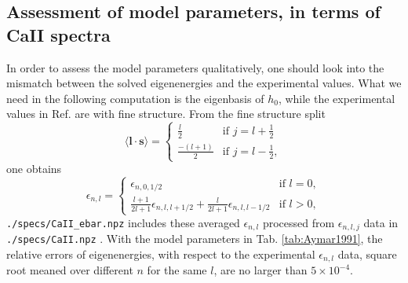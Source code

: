 \documentclass{article}
\begin{document}
\subsection{Assessment of model parameters, in terms of CaII spectra}
In order to assess the model parameters qualitatively, one should look into the mismatch between the solved eigenenergies and the experimental values. What we need in the following computation is the eigenbasis of $h_0$, while the experimental values in Ref. \cite{SC85} are with fine structure. From the fine structure split
\begin{equation}
\langle\bm{l}\cdot\bm{s}\rangle = \left\{
\begin{array}{ll}
\frac l2 &\text{if }j=l+\frac 12\\
\frac{-(l+1)}{2} &\text{if }j=l-\frac{1}{2},
\end{array}\right.
\end{equation}
one obtains
\begin{equation}
\epsilon_{n,l} = \left\{
\begin{array}{ll}
\epsilon_{n,0,1/2} & \text{if }l=0,\\
\frac{l+1}{2l+1}\epsilon_{n,l,l+1/2} + \frac{l}{2l+1}\epsilon_{n,l,l-1/2} & \text{if }l>0 ,
\end{array}\right.
\end{equation}
\texttt{./specs/CaII_ebar.npz} includes these averaged $\epsilon_{n,l}$ processed from $\epsilon_{n,l,j}$ data in \texttt{./specs/CaII.npz} . With the model parameters in Tab. \ref{tab:Aymar1991}, the relative errors of eigenenergies, with respect to the experimental $\epsilon_{n,l}$ data, square root meaned over different $n$ for the same $l$, are no larger than $5\times 10^{-4}$.
\end{document}

